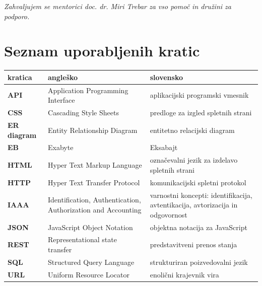\documentclass[a4paper, 12pt]{book}
\newcommand{\clearemptydoublepage}{\newpage{\pagestyle{empty}\cleardoublepage}}
\begin{document}
\vspace{2cm}

\clearemptydoublepage

\thispagestyle{empty}\mbox{}\vfill\null\it%
\noindent
Zahvaljujem se mentorici doc. dr. Miri Trebar za vso pomoč in družini za podporo.
\rm\normalfont

\clearemptydoublepage




\pagestyle{empty}
\def\thepage{}%
\tableofcontents{}


\clearemptydoublepage


\chapter*{Seznam uporabljenih kratic}  %

\noindent \begin{tabular}{p{}|p{}|p{}}    %
{\bf kratica} & {\bf angleško}                             & {\bf slovensko} \\ \hline
{\bf API} & Application Programming Interface & aplikacijski programski vmesnik \\
{\bf CSS} & Cascading Style Sheets & predloge za izgled spletnih strani \\
{\bf ER diagram} & Entity Relationship Diagram & entitetno relacijski diagram \\
{\bf EB} & Exabyte & Eksabajt \\
{\bf HTML} & Hyper Text Markup Language & označevalni jezik za izdelavo spletnih strani \\
{\bf HTTP} & Hyper Text Transfer Protocol & komunikacijski spletni protokol \\
{\bf IAAA} & Identification, Authentication, Authorization and Accounting & varnostni koncepti: identifikacija, avtentikacija, avtorizacija in odgovornost \\
{\bf JSON} & JavaScript Object Notation & objektna notacija za JavaScript \\
{\bf REST} & Representational state transfer & predstavitveni prenos stanja \\
{\bf SQL} & Structured Query Language & strukturiran poizvedovalni jezik \\
{\bf URL} & Uniform Resource Locator & enolični krajevnik vira \\
\end{tabular}
\end{document}
